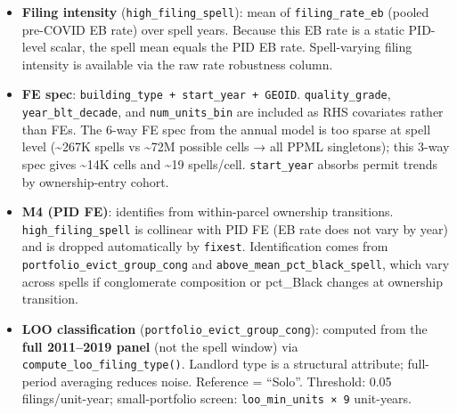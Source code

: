 \documentclass[
  11pt,
]{article}
\providecommand{\tightlist}{%
  \setlength{\itemsep}{0pt}\setlength{\parskip}{0pt}}
\begin{document}
\begin{itemize}
\tightlist
\item
  \textbf{Filing intensity} (\texttt{high\_filing\_spell}): mean of
  \texttt{filing\_rate\_eb} (pooled pre-COVID EB rate) over spell years.
  Because this EB rate is a static PID-level scalar, the spell mean
  equals the PID EB rate. Spell-varying filing intensity is available
  via the raw rate robustness column.
\item
  \textbf{FE spec}: \texttt{building\_type\ +\ start\_year\ +\ GEOID}.
  \texttt{quality\_grade}, \texttt{year\_blt\_decade}, and
  \texttt{num\_units\_bin} are included as RHS covariates rather than
  FEs. The 6-way FE spec from the annual model is too sparse at spell
  level (\textasciitilde267K spells vs \textasciitilde72M possible cells
  → all PPML singletons); this 3-way spec gives \textasciitilde14K cells
  and \textasciitilde19 spells/cell. \texttt{start\_year} absorbs permit
  trends by ownership-entry cohort.
\item
  \textbf{M4 (PID FE)}: identifies from within-parcel ownership
  transitions. \texttt{high\_filing\_spell} is collinear with PID FE (EB
  rate does not vary by year) and is dropped automatically by
  \texttt{fixest}. Identification comes from
  \texttt{portfolio\_evict\_group\_cong} and
  \texttt{above\_mean\_pct\_black\_spell}, which vary across spells if
  conglomerate composition or pct\_Black changes at ownership
  transition.
\item
  \textbf{LOO classification} (\texttt{portfolio\_evict\_group\_cong}):
  computed from the \textbf{full 2011--2019 panel} (not the spell
  window) via \texttt{compute\_loo\_filing\_type()}. Landlord type is a
  structural attribute; full-period averaging reduces noise. Reference =
  ``Solo''. Threshold: 0.05 filings/unit-year; small-portfolio screen:
  \texttt{loo\_min\_units\ ×\ 9} unit-years.
\end{itemize}
\end{document}

